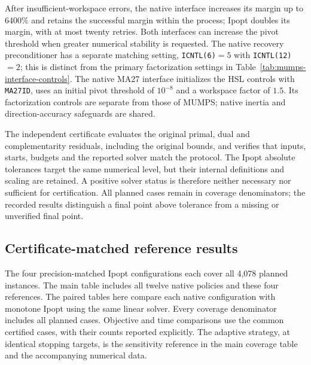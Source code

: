 \documentclass[pdflatex,sn-mathphys-num]{sn-jnl}
\theoremstyle{thmstyleone}
\theoremstyle{thmstylethree}
\begin{document}
After insufficient-workspace errors, the native interface increases its
margin up to 6400\% and retains the successful margin within the process;
Ipopt doubles its margin, with at most twenty retries. Both interfaces
can increase the pivot threshold when greater numerical stability is
requested.
The native recovery preconditioner has a separate matching setting,
\texttt{ICNTL(6)}$=5$ with \texttt{ICNTL(12)}$=2$; this is distinct from
the primary factorization settings in Table~\ref{tab:mumps-interface-controls}.
The native MA27 interface initializes the HSL controls with
\texttt{MA27ID}, uses an initial pivot threshold of $10^{-8}$ and a
workspace factor of $1.5$. Its factorization controls are separate from
those of MUMPS; native inertia and direction-accuracy safeguards are
shared.

The independent certificate evaluates the original primal, dual and
complementarity residuals, including the original bounds, and verifies
that inputs, starts, budgets and the reported solver match the protocol.
The Ipopt absolute tolerances target the same
numerical level, but their internal definitions and scaling are retained.
A positive solver status is therefore neither necessary nor sufficient
for certification. All planned cases remain in coverage denominators;
the recorded results distinguish a final point above tolerance from a
missing or unverified final point.


\subsection{Certificate-matched reference results}\label{app:aligned-reference-results}
The four precision-matched Ipopt configurations each cover all 4,078
planned instances. The main table includes all twelve native policies
and these four references. The paired tables here compare each native
configuration with monotone Ipopt using the same linear solver. Every
coverage denominator includes all planned cases. Objective and time
comparisons use the common certified cases, with their counts reported explicitly.
The adaptive strategy, at identical stopping targets, is the sensitivity
reference in the main coverage table and the accompanying numerical data.
\end{document}
